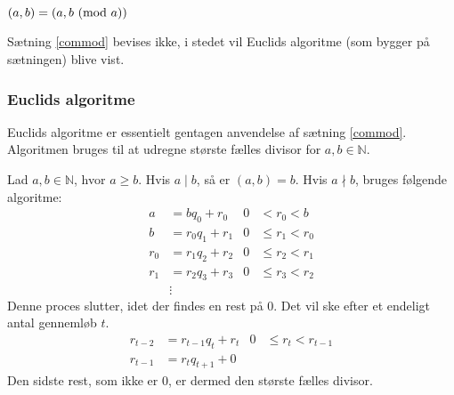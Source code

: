 \begin{sent}
    \label{commod}
    \((a, b) = (a, b \ (\mathrm{mod}\ a))\)
\end{sent}

Sætning \ref{commod} bevises ikke, i stedet vil Euclids algoritme (som bygger på sætningen) blive vist.



\subsubsection{Euclids algoritme}
Euclids algoritme er essentielt gentagen anvendelse af sætning \ref{commod}.
Algoritmen bruges til at udregne største fælles divisor for \(a, b \in \mathbb{N}\).
\begin{definition}
    Lad \(a, b \in \mathbb{N}\), hvor \(a \geq b\).
    Hvis \(a \mid b\), så er \((a, b) = b\).
    Hvis \(a \nmid b\), bruges følgende algoritme:
    \begin{align*}
        a   &= b q_0    + r_0   & 0 &<    r_0 < b\\
        b   &= r_0 q_1  + r_1   & 0 &\leq r_1 < r_0\\
        r_0 &= r_1 q_2  + r_2   & 0 &\leq r_2 < r_1\\
        r_1 &= r_2 q_3  + r_3   & 0 &\leq r_3 < r_2\\
        &\vdots
    \end{align*}
    Denne proces slutter, idet der findes en rest på 0.
    Det vil ske efter et endeligt antal gennemløb \(t\).
    \begin{align*}
        r_{t-2} &= r_{t-1}  q_t      + r_t   & 0 &\leq r_t < r_{t-1}\\
        r_{t-1} &= r_t      q_{t+1}  + 0
    \end{align*}
    Den sidste rest, som ikke er 0, er dermed den største fælles divisor.\cite[11]{absalg}
\end{definition}

